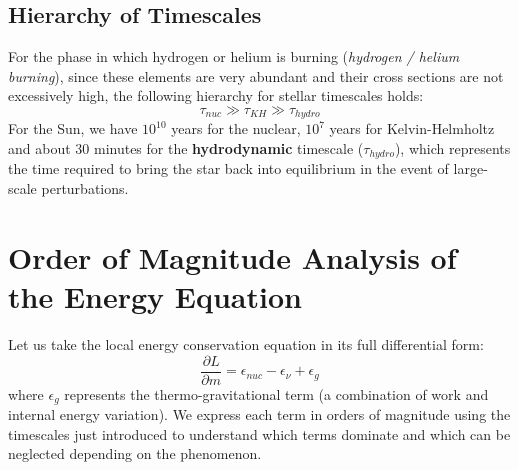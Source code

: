 \subsection{Hierarchy of Timescales}
For the phase in which hydrogen or helium is burning (\textit{hydrogen / helium burning}), since these elements are very abundant and their cross sections are not excessively high, the following hierarchy for stellar timescales holds:
\begin{equation}
\tau_{nuc} \gg \tau_{KH} \gg \tau_{hydro}
\end{equation}
For the Sun, we have $10^{10}$ years for the nuclear, $10^7$ years for Kelvin-Helmholtz and about $30$ minutes for the \textbf{hydrodynamic} timescale ($\tau_{hydro}$), which represents the time required to bring the star back into equilibrium in the event of large-scale perturbations.

\section{Order of Magnitude Analysis of the Energy Equation}

Let us take the local energy conservation equation in its full differential form:
\begin{equation}
\frac{\partial L}{\partial m} = \epsilon_{nuc} - \epsilon_{\nu} + \epsilon_g
\end{equation}
where $\epsilon_g$ represents the thermo-gravitational term (a combination of work and internal energy variation). We express each term in orders of magnitude using the timescales just introduced to understand which terms dominate and which can be neglected depending on the phenomenon.

